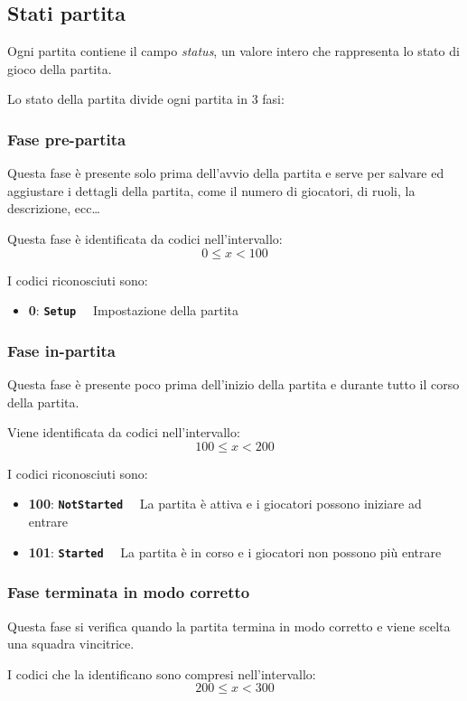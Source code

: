 \documentclass[10pt,a4paper]{article}
\newcommand{\gamestatus}[3]{
\textbf{#1}: \textbf{\texttt{#2}}$\quad$ #3
}
\begin{document}
\subsection{Stati partita}
Ogni partita contiene il campo \emph{status}, un valore intero che rappresenta lo stato di gioco della partita.

Lo stato della partita divide ogni partita in 3 fasi:

\subsubsection{Fase pre-partita}
Questa fase è presente solo prima dell'avvio della partita e serve per salvare ed aggiustare i dettagli della partita, come il numero di giocatori, di ruoli, la descrizione, ecc\dots

Questa fase è identificata da codici nell'intervallo:
\[
	0 \le x < 100
\]

I codici riconosciuti sono:
\begin{itemize}
\item \gamestatus{0}{Setup}{Impostazione della partita}
\end{itemize}

\subsubsection{Fase in-partita}
Questa fase è presente poco prima dell'inizio della partita e durante tutto il corso della partita. 

Viene identificata da codici nell'intervallo:
\[
	100 \le x < 200
\]

I codici riconosciuti sono:
\begin{itemize}
\item \gamestatus{100}{NotStarted}{La partita è attiva e i giocatori possono iniziare ad entrare}
\item \gamestatus{101}{Started}{La partita è in corso e i giocatori non possono più entrare}
\end{itemize}

\subsubsection{Fase terminata in modo corretto}
Questa fase si verifica quando la partita termina in modo corretto e viene scelta una squadra vincitrice.

I codici che la identificano sono compresi nell'intervallo:
\[
	200 \le x < 300
\]
\end{document}
